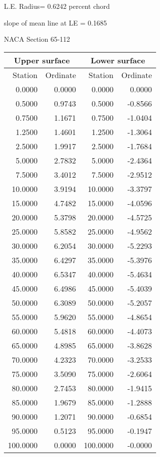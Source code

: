 \documentclass[11pt]{book}
\begin{document}
L.E. Radius=  0.6242 percent chord


 slope of mean line at LE =  0.1685
 \newpage
  \label{s65-112}
 \begin{Large}
 NACA Section 65-112
 \end{Large}
  
 \vspace{8mm}
 \begin{tabular}{|r|r|r|r|} \hline 
 \multicolumn{2}{|c|}{Upper surface} & \multicolumn{2}{|c|}{Lower surface} \\
 \hline
 Station & Ordinate & Station & Ordinate \\
 \hline
0.0000 & 0.0000 & 0.0000 & 0.0000 \\
0.5000 & 0.9743 & 0.5000 & -0.8566 \\
0.7500 & 1.1671 & 0.7500 & -1.0404 \\
1.2500 & 1.4601 & 1.2500 & -1.3064 \\
2.5000 & 1.9917 & 2.5000 & -1.7684 \\
5.0000 & 2.7832 & 5.0000 & -2.4364 \\
7.5000 & 3.4012 & 7.5000 & -2.9512 \\
10.0000 & 3.9194 & 10.0000 & -3.3797 \\
15.0000 & 4.7482 & 15.0000 & -4.0596 \\
20.0000 & 5.3798 & 20.0000 & -4.5725 \\
25.0000 & 5.8582 & 25.0000 & -4.9562 \\
30.0000 & 6.2054 & 30.0000 & -5.2293 \\
35.0000 & 6.4297 & 35.0000 & -5.3976 \\
40.0000 & 6.5347 & 40.0000 & -5.4634 \\
45.0000 & 6.4986 & 45.0000 & -5.4039 \\
50.0000 & 6.3089 & 50.0000 & -5.2057 \\
55.0000 & 5.9620 & 55.0000 & -4.8654 \\
60.0000 & 5.4818 & 60.0000 & -4.4073 \\
65.0000 & 4.8985 & 65.0000 & -3.8628 \\
70.0000 & 4.2323 & 70.0000 & -3.2533 \\
75.0000 & 3.5090 & 75.0000 & -2.6064 \\
80.0000 & 2.7453 & 80.0000 & -1.9415 \\
85.0000 & 1.9679 & 85.0000 & -1.2888 \\
90.0000 & 1.2071 & 90.0000 & -0.6854 \\
95.0000 & 0.5123 & 95.0000 & -0.1947 \\
100.0000 & 0.0000 & 100.0000 & -0.0000 \\
 \hline 
 \end{tabular}
\end{document}
